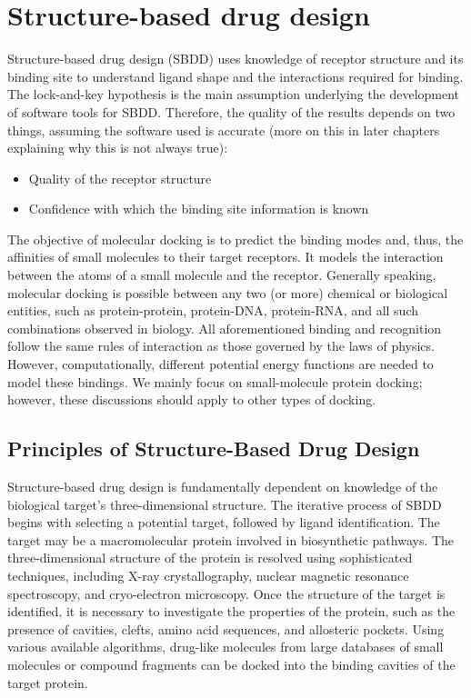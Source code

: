 \documentclass[12pt]{article}
\begin{document}
\section{Structure-based drug design}

Structure-based drug design (SBDD) uses knowledge of receptor structure and its binding site to understand ligand shape and the interactions required for binding. The lock-and-key hypothesis is the main assumption underlying the development of software tools for SBDD. Therefore, the quality of the results depends on two things, assuming the software used is accurate (more on this in later chapters explaining why this is not always true):

\begin{itemize}

    \item Quality of the receptor structure

    \item Confidence with which the binding site information is known

\end{itemize}

The objective of molecular docking is to predict the binding modes and, thus, the affinities of small molecules to their target receptors. It models the interaction between the atoms of a small molecule and the receptor. Generally speaking, molecular docking is possible between any two (or more) chemical or biological entities, such as protein-protein, protein-DNA, protein-RNA, and all such combinations observed in biology. All aforementioned binding and recognition follow the same rules of interaction as those governed by the laws of physics. However, computationally, different potential energy functions are needed to model these bindings. We mainly focus on small-molecule protein docking; however, these discussions should apply to other types of docking. 



\subsection{Principles of Structure-Based Drug Design}

Structure-based drug design is fundamentally dependent on knowledge of the biological target's three-dimensional structure. The iterative process of SBDD begins with selecting a potential target, followed by ligand identification. The target may be a macromolecular protein involved in biosynthetic pathways. The three-dimensional structure of the protein is resolved using sophisticated techniques, including X-ray crystallography, nuclear magnetic resonance spectroscopy, and cryo-electron microscopy. Once the structure of the target is identified, it is necessary to investigate the properties of the protein, such as the presence of cavities, clefts, amino acid sequences, and allosteric pockets. Using various available algorithms, drug-like molecules from large databases of small molecules or compound fragments can be docked into the binding cavities of the target protein.
\end{document}
